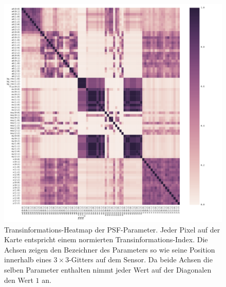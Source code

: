 \begin{figure}[H]
	\centering
	\includegraphics[scale=.56]{heatmaps/psf.pdf}
	\caption[Transinformations-Heatmap der PSF-Parameter]{Transinformations-Heatmap der PSF-Parameter. Jeder Pixel auf der Karte entspricht einem normierten Transinformations-Index. Die Achsen zeigen den Bezeichner des Parameters so wie seine Position innerhalb eines $3\times 3$-Gitters auf dem Sensor.  Da beide Achsen die selben Parameter enthalten nimmt jeder Wert auf der Diagonalen den Wert $\num{1}$ an.}
    \label{heatmap_psf_inline}
\end{figure}

